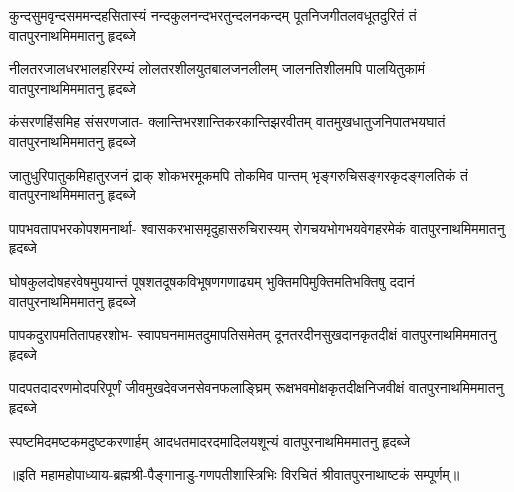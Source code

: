 
\fourlineindentedshloka
{कुन्दसुमवृन्दसममन्दहसितास्यं}
{नन्दकुलनन्दभरतुन्दलनकन्दम्}
{पूतनिजगीतलवधूतदुरितं तं}
{वातपुरनाथमिममातनु हृदब्जे} %


\fourlineindentedshloka
{नीलतरजालधरभालहरिरम्यं}
{लोलतरशीलयुतबालजनलीलम्}
{जालनतिशीलमपि पालयितुकामं}
{वातपुरनाथमिममातनु हृदब्जे} %

\fourlineindentedshloka
{कंसरणहिंसमिह संसरणजात-}
{क्लान्तिभरशान्तिकरकान्तिझरवीतम्}
{वातमुखधातुजनिपातभयघातं}
{वातपुरनाथमिममातनु हृदब्जे} %


\fourlineindentedshloka
{जातुधुरिपातुकमिहातुरजनं द्राक्}
{शोकभरमूकमपि तोकमिव पान्तम्}
{भृङ्गरुचिसङ्गरकृदङ्गलतिकं तं}
{वातपुरनाथमिममातनु हृदब्जे} %


\fourlineindentedshloka
{पापभवतापभरकोपशमनार्था-}
{श्वासकरभासमृदुहासरुचिरास्यम्}
{रोगचयभोगभयवेगहरमेकं}
{वातपुरनाथमिममातनु हृदब्जे} %


\fourlineindentedshloka
{घोषकुलदोषहरवेषमुपयान्तं}
{पूषशतदूषकविभूषणगणाढ्यम्}
{भुक्तिमपिमुक्तिमतिभक्तिषु ददानं}
{वातपुरनाथमिममातनु हृदब्जे} %


\fourlineindentedshloka
{पापकदुरापमतितापहरशोभ-}
{स्वापघनमामतदुमापतिसमेतम्}
{दूनतरदीनसुखदानकृतदीक्षं}
{वातपुरनाथमिममातनु हृदब्जे} %


\fourlineindentedshloka
{पादपतदादरणमोदपरिपूर्णं}
{जीवमुखदेवजनसेवनफलाङ्घ्रिम्}
{रूक्षभवमोक्षकृतदीक्षनिजवीक्षं}
{वातपुरनाथमिममातनु हृदब्जे} %


{स्पष्टमिदमष्टकमदुष्टकरणार्हम्}
{आदधतमादरदमादिलयशून्यं}
{वातपुरनाथमिममातनु हृदब्जे} %


॥इति महामहोपाध्याय-ब्रह्मश्री-पैङ्गानाडु-गणपतीशास्त्रिभिः विरचितं श्रीवातपुरनाथाष्टकं सम्पूर्णम्॥
